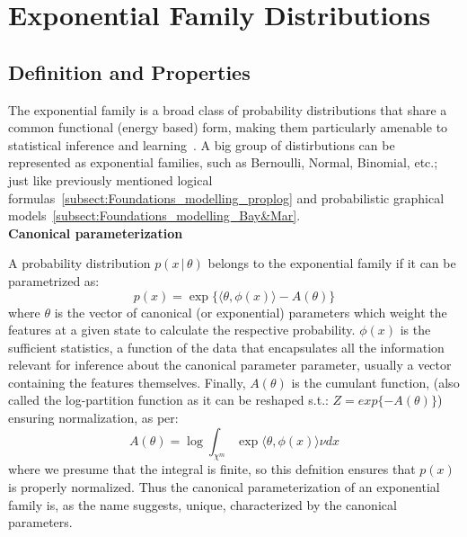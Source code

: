 \documentclass[encoding=utf8,british]{tumphthesis}
\begin{document}
    \section{Exponential Family Distributions}
    \label{sect:Foundations_ExpFam}
        \subsection{Definition and Properties}
        \label{subsect:Foundations_ExpFam_Definition}
            The exponential family is a broad class of probability distributions that share a common functional (energy based) form, making them 
            particularly amenable to statistical inference and learning~\cite{NOW-exp}\cite{Geiger-exp}. A big group of distirbutions can be represented
            as exponential families, such as Bernoulli, Normal, Binomial, etc.; just like previously mentioned logical formulas~\ref{subsect:Foundations_modelling_proplog} 
            and probabilistic graphical models~\ref{subsect:Foundations_modelling_Bay&Mar}.
            \\

            \textbf{Canonical parameterization}
            
            A probability distribution $p(x\,|\,\theta)$ belongs to the exponential family if it can be parametrized as:
            \begin{equation}
                p(x) = \exp \{ \langle \theta , \phi(x) \rangle - A(\theta) \}
                \label{eq:expfam_def}
            \end{equation}
            where $\theta$ is the vector of canonical (or exponential) parameters which weight the features at a given state to calculate the
            respective probability. $\phi(x)$ is the sufficient statistics, a function of the data that encapsulates all the information relevant 
            for inference about the canonical parameter parameter, usually a vector containing the features themselves. Finally, $A(\theta)$ is the cumulant function, 
            (also called the log-partition function as it can be reshaped s.t.: $Z = exp\{- A(\theta)\}$) ensuring normalization, as per:
            \begin{equation*}
                A(\theta) = \log \int_{\chi^m} \exp \langle \theta , \phi(x) \rangle \nu dx
            \end{equation*}
            where we presume that the integral is finite, so this defnition ensures that $p(x)$ is properly normalized.
            Thus the canonical parameterization of an exponential family is, as the name suggests, unique, characterized by the canonical parameters.
            \\
\end{document}
